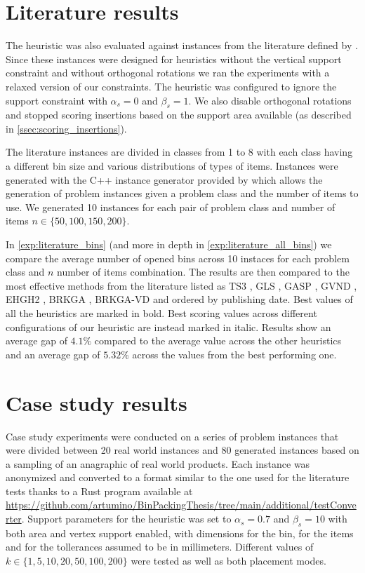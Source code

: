 \section{Literature results}
The heuristic was also evaluated against instances from the literature defined by \citeauthor{martello2000three}.
Since these instances were designed for heuristics without the vertical support constraint and without orthogonal rotations we ran the experiments with a relaxed version of our constraints.
The heuristic was configured to ignore the support constraint with $\alpha_s = 0$ and $\beta_s = 1$. We also disable orthogonal rotations and stopped scoring insertions based on the support area available (as described in \cref{ssec:scoring_insertions}).

\label{def:class1_instances}
The literature instances are divided in classes from 1 to 8 with each class having a different bin size and various distributions of types of items.
Instances were generated with the C++ instance generator provided by \citeauthor{martello2000three} which allows the generation of problem instances given a problem class and the number of items to use.
We generated 10 instances for each pair of problem class and number of items $n \in \{50, 100, 150, 200\}$.

In \cref{exp:literature_bins} (and more in depth in \cref{exp:literature_all_bins}) we compare the average number of opened bins across 10 instaces for each problem class and $n$ number of items combination.
The results are then compared to the most effective methods from the literature listed as TS3 \citep{lodi2002heuristic}, GLS \citep{faroe2003guided}, GASP \citep{crainic2009ts2pack}, GVND \citep{parreno2010hybrid}, EHGH2 \citep{hifi2014hybrid}, BRKGA \citep{gonccalves2013biased}, BRKGA-VD \citep{zudio2018brkga} and ordered by publishing date.
Best values of all the heuristics are marked in bold. Best scoring values across different configurations of our heuristic are instead marked in italic.
Results show an average gap of $4.1\%$ compared to the average value across the other heuristics and an average gap of $5.32\%$ across the values from the best performing one.

\label{exp:literature_tests}




\section{Case study results}
Case study experiments were conducted on a series of problem instances that were divided between 20 real world instances and 80 generated instances based on a sampling of an anagraphic of real world products.
Each instance was anonymized and converted to a format similar to the one used for the literature tests thanks to a Rust program available at \url{https://github.com/artumino/BinPackingThesis/tree/main/additional/testConverter}.
Support parameters for the heuristic was set to $\alpha_s = 0.7$ and $\beta_s = 10$ with both area and vertex support enabled, with dimensions for the bin, for the items and for the tollerances assumed to be in millimeters.
Different values of $k \in \{1, 5, 10, 20, 50, 100, 200\}$ were tested as well as both placement modes.

